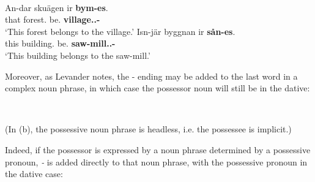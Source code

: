 \ea\label{}
\\
	\ea
		\gll An-dar  skuägen  ir  \textbf{bym-es}.\\
			that  forest.{}  be.{\prs}  \textbf{village.{}.{\dat}-{\poss}}\\
		\glt ‘This forest belongs to the village.’
	\ex
		\gll Isn-jär  byggnan  ir  \textbf{sån-es}.\\
		this  building.{}  be.{\prs}  \textbf{saw-mill.{}.{\dat}-{\poss}}\\
		\glt  ‘This building belongs to the saw-mill.’
	\z
\z 

Moreover, as Levander notes, the \nobreakdash- ending may be added to the last word in a complex noun phrase, in which case the possessor noun will still be in the dative:

\ea 
{}\\
	\z
\z 


(In (b), the possessive noun phrase is headless, i.e. the possessee is implicit.) 

Indeed, if the possessor is expressed by a noun phrase determined by a possessive pronoun,\textit{ {}-} is added directly to that noun phrase, with the possessive pronoun in the dative case:

